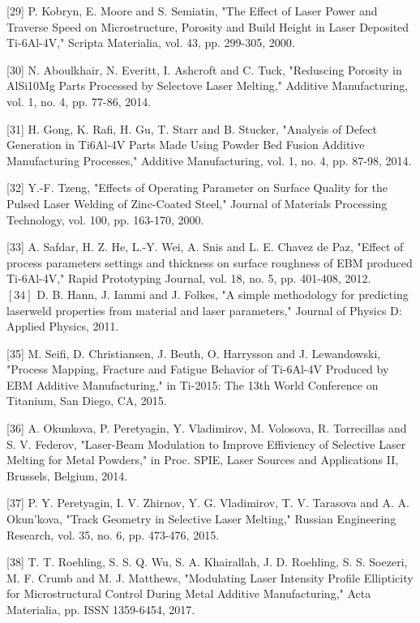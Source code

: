 \documentclass[10pt]{article}
\begin{document}
[29] P. Kobryn, E. Moore and S. Semiatin, "The Effect of Laser Power and Traverse Speed on Microstructure, Porosity and Build Height in Laser Deposited Ti-6Al-4V," Scripta Materialia, vol. 43, pp. 299-305, 2000.

[30] N. Aboulkhair, N. Everitt, I. Ashcroft and C. Tuck, "Reduscing Porosity in AlSi10Mg Parts Processed by Selectove Laser Melting," Additive Manufacturing, vol. 1, no. 4, pp. 77-86, 2014.

[31] H. Gong, K. Rafi, H. Gu, T. Starr and B. Stucker, "Analysis of Defect Generation in Ti6Al-4V Parts Made Using Powder Bed Fusion Additive Manufacturing Processes," Additive Manufacturing, vol. 1, no. 4, pp. 87-98, 2014.

[32] Y.-F. Tzeng, "Effects of Operating Parameter on Surface Quality for the Pulsed Laser Welding of Zinc-Coated Steel," Journal of Materials Processing Technology, vol. 100, pp. 163-170, 2000.

[33] A. Safdar, H. Z. He, L.-Y. Wei, A. Snis and L. E. Chavez de Paz, "Effect of process parameters settings and thickness on surface roughness of EBM produced Ti-6Al-4V," Rapid Prototyping Journal, vol. 18, no. 5, pp. 401-408, 2012.\\
$[34]$ D. B. Hann, J. Iammi and J. Folkes, "A simple methodology for predicting laserweld properties from material and laser parameters," Journal of Physics D: Applied Physics, 2011.

[35] M. Seifi, D. Christiansen, J. Beuth, O. Harrysson and J. Lewandowski, "Process Mapping, Fracture and Fatigue Behavior of Ti-6Al-4V Produced by EBM Additive Manufacturing," in Ti-2015: The 13th World Conference on Titanium, San Diego, CA, 2015.

[36] A. Okunkova, P. Peretyagin, Y. Vladimirov, M. Volosova, R. Torrecillas and S. V. Federov, "Laser-Beam Modulation to Improve Effiviency of Selective Laser Melting for Metal Powders," in Proc. SPIE, Laser Sources and Applications II, Brussels, Belgium, 2014.

[37] P. Y. Peretyagin, I. V. Zhirnov, Y. G. Vladimirov, T. V. Tarasova and A. A. Okun'kova, "Track Geometry in Selective Laser Melting," Russian Engineering Research, vol. 35, no. 6, pp. 473-476, 2015.

[38] T. T. Roehling, S. S. Q. Wu, S. A. Khairallah, J. D. Roehling, S. S. Soezeri, M. F. Crumb and M. J. Matthews, "Modulating Laser Intensity Profile Ellipticity for Microstructural Control During Metal Additive Manufacturing," Acta Materialia, pp. ISSN 1359-6454, 2017.
\end{document}
